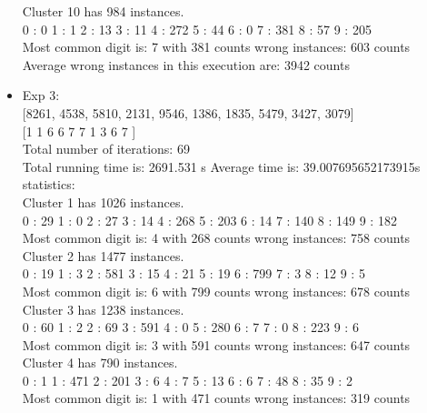 \documentclass[paper=a4, fontsize=11pt]{scrartcl} %
\numberwithin{equation}{section} %
\numberwithin{figure}{section} %
\numberwithin{table}{section} %
\begin{document}
\begin{itemize}
Cluster 10 has 984 instances.\\
0 : 0   1 : 1   2 : 13  3 : 11  4 : 272 5 : 44  6 : 0   7 : 381 8 : 57  9 : 205\\
Most common digit is: 7 with 381 counts wrong instances: 603 counts\\

Average wrong instances in this execution are: 3942 counts\\

\item Exp 3: \\

[8261, 4538, 5810, 2131, 9546, 1386, 1835, 5479, 3427, 3079]\\

[1 1 6 6 7 7 1 3 6 7 ] \\

 Total number of iterations: 69\\
 
Total running time is: 2691.531 s Average time is: 39.007695652173915s\\

statistics: \\

Cluster 1 has 1026 instances.\\
0 : 29  1 : 0   2 : 27  3 : 14  4 : 268 5 : 203 6 : 14  7 : 140 8 : 149 9 : 182\\
Most common digit is: 4 with 268 counts wrong instances: 758 counts\\

Cluster 2 has 1477 instances.\\
0 : 19  1 : 3   2 : 581 3 : 15  4 : 21  5 : 19  6 : 799 7 : 3   8 : 12  9 : 5\\
Most common digit is: 6 with 799 counts wrong instances: 678 counts\\

Cluster 3 has 1238 instances.\\
0 : 60  1 : 2   2 : 69  3 : 591 4 : 0   5 : 280 6 : 7   7 : 0   8 : 223 9 : 6\\
Most common digit is: 3 with 591 counts wrong instances: 647 counts\\

Cluster 4 has 790 instances.\\
0 : 1   1 : 471 2 : 201 3 : 6   4 : 7   5 : 13  6 : 6   7 : 48  8 : 35  9 : 2\\
Most common digit is: 1 with 471 counts wrong instances: 319 counts\\


\end{itemize}
\end{document}

